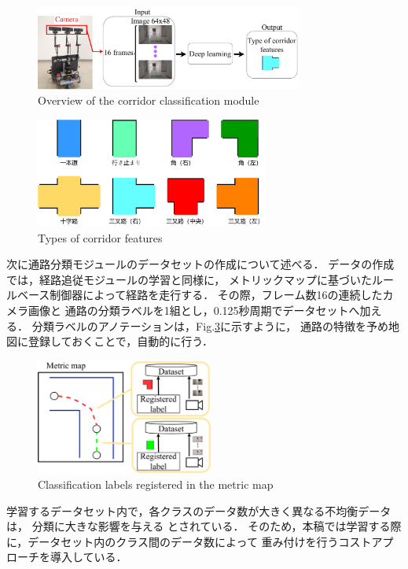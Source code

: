 \documentclass{sice-si}
\begin{document}
\begin{figure}[h!]
    \centering
     \includegraphics[height=28mm]{./figs/corridor_class.pdf}
     \caption{Overview of the corridor classification module}\label{fig:lrcn}
\end{figure}
\begin{figure}[h!]
    \centering
     \includegraphics[height=36mm]{./figs/corridor.pdf}
     \caption{Types of corridor features}\label{fig:intersection}
\end{figure}
\par
次に通路分類モジュールのデータセットの作成について述べる．
データの作成では，経路追従モジュールの学習と同様に，
メトリックマップに基づいたルールベース制御器によって経路を走行する．
その際，フレーム数16の連続したカメラ画像と
通路の分類ラベルを1組とし，0.125秒周期でデータセットへ加える．
分類ラベルのアノテーションは，Fig.\ref{fig:map2label}に示すように，
通路の特徴を予め地図に登録しておくことで，自動的に行う．
\begin{figure}[h!]
    \centering
     \includegraphics[height=38mm]{./figs/map_label.pdf}
     \caption{Classification labels registered in the metric map}\label{fig:map2label}
\end{figure}
\par
学習するデータセット内で，各クラスのデータ数が大きく異なる不均衡データは，
分類に大きな影響を与える
\cite{hukin}
とされている．
そのため，本稿では学習する際に，データセット内のクラス間のデータ数によって
重み付けを行うコストアプローチ\cite{cost}を導入している．
\end{document}
